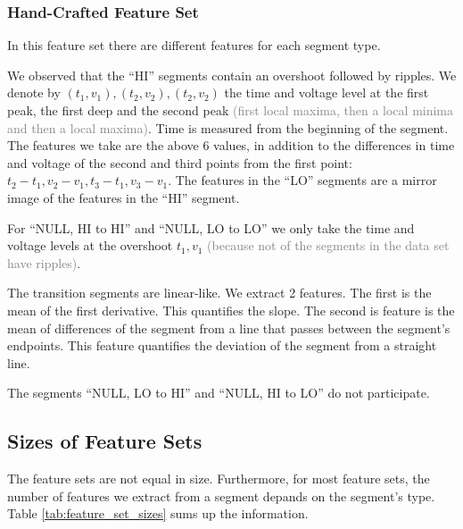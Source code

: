 \documentclass[conference]{IEEEtran}
\begin{document}
\subsubsection{Hand-Crafted Feature Set}

  In this feature set there are different features for each segment type.
  
  We observed that the ``HI'' segments contain an overshoot followed by ripples. We denote by \((t_1, v_1), (t_2, v_2), (t_2, v_2)\) the time and voltage level at the first peak, the first deep and the second peak \textcolor{gray}{(first local maxima, then a local minima and then a local maxima)}. Time is measured from the beginning of the segment. The features we take are the above 6 values, in addition to the differences in time and voltage of the second and third points from the first point: \(t_2-t_1, v_2-v_1, t_3-t_1, v_3-v_1\). The features in the ``LO'' segments are a mirror image of the features in the ``HI'' segment.
  
  For ``NULL, HI to HI'' and ``NULL, LO to LO'' we only take the time and voltage levels at the overshoot \(t_1, v_1\) \textcolor{gray}{(because not of the segments in the data set have ripples)}.
  
  The transition segments are linear-like. We extract 2 features. The first is the mean of the first derivative. This quantifies the slope. The second is feature is the mean of differences of the segment from a line that passes between the segment's endpoints. This feature quantifies the deviation of the segment from a straight line.
  
  The segments ``NULL, LO to HI'' and ``NULL, HI to LO'' do not participate.
  
\subsection{Sizes of Feature Sets}

  The feature sets are not equal in size. Furthermore, for most feature sets, the number of features we extract from a segment depands on the segment's type. Table \ref{tab:feature_set_sizes} sums up the information.
\end{document}
